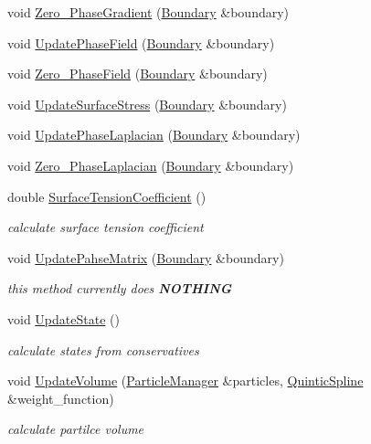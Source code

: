 \begin{CompactItemize}
void \hyperlink{classHydrodynamics_3c9019f19ccac5370b7b0ccda343b5d2}{Zero\_\-PhaseGradient} (\hyperlink{classBoundary}{Boundary} \&boundary)
\item 
void \hyperlink{classHydrodynamics_c87ff6437d540454ed7de2f726858f4a}{UpdatePhaseField} (\hyperlink{classBoundary}{Boundary} \&boundary)
\item 
void \hyperlink{classHydrodynamics_dedab91b9a62eb7e26931cbbe73f79cc}{Zero\_\-PhaseField} (\hyperlink{classBoundary}{Boundary} \&boundary)
\item 
void \hyperlink{classHydrodynamics_f5b2c4ad14824e4b6192faa6f60f4014}{UpdateSurfaceStress} (\hyperlink{classBoundary}{Boundary} \&boundary)
\item 
void \hyperlink{classHydrodynamics_dbbe86fd4eac49912a9ffb5e284883ee}{UpdatePhaseLaplacian} (\hyperlink{classBoundary}{Boundary} \&boundary)
\item 
void \hyperlink{classHydrodynamics_d1c5fd5b500eacb886a72f2dab13e91b}{Zero\_\-PhaseLaplacian} (\hyperlink{classBoundary}{Boundary} \&boundary)
\item 
double \hyperlink{classHydrodynamics_e6983cf4d86bf7b33b88c8f089caf3a8}{SurfaceTensionCoefficient} ()
\begin{CompactList}\small\item\em calculate surface tension coefficient \item\end{CompactList}\item 
void \hyperlink{classHydrodynamics_a755853b07cbbc5b484d78a3e787d1ef}{UpdatePahseMatrix} (\hyperlink{classBoundary}{Boundary} \&boundary)
\begin{CompactList}\small\item\em this method currently does {\bf NOTHING} \item\end{CompactList}\item 
void \hyperlink{classHydrodynamics_1698dbe8ecc0e730319de5d7eca7a891}{UpdateState} ()
\begin{CompactList}\small\item\em calculate states from conservatives \item\end{CompactList}\item 
void \hyperlink{classHydrodynamics_09a3f5a5c055e0efc822fdf80f40cd7d}{UpdateVolume} (\hyperlink{classParticleManager}{ParticleManager} \&particles, \hyperlink{classQuinticSpline}{QuinticSpline} \&weight\_\-function)
\begin{CompactList}\small\item\em calculate partilce volume \item\end{CompactList}\item 

\end{CompactItemize}
